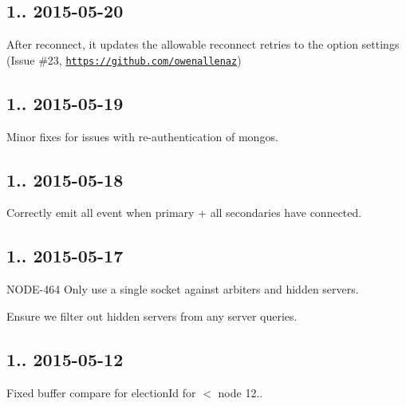 \subsection*{1.. 2015-\/05-\/20 }


\begin{DoxyItemize}
\item After reconnect, it updates the allowable reconnect retries to the option settings (Issue \#23, \href{https://github.com/owenallenaz}{\tt https\+://github.\+com/owenallenaz})
\end{DoxyItemize}

\subsection*{1.. 2015-\/05-\/19 }


\begin{DoxyItemize}
\item Minor fixes for issues with re-\/authentication of mongos.
\end{DoxyItemize}

\subsection*{1.. 2015-\/05-\/18 }


\begin{DoxyItemize}
\item Correctly emit \textquotesingle{}all\textquotesingle{} event when primary + all secondaries have connected.
\end{DoxyItemize}

\subsection*{1.. 2015-\/05-\/17 }


\begin{DoxyItemize}
\item N\+O\+D\+E-\/464 Only use a single socket against arbiters and hidden servers.
\item Ensure we filter out hidden servers from any server queries.
\end{DoxyItemize}

\subsection*{1.. 2015-\/05-\/12 }


\begin{DoxyItemize}
\item Fixed buffer compare for election\+Id for $<$ node 12..
\end{DoxyItemize}

